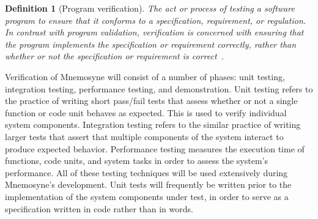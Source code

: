 \documentclass[11pt,a4paper]{article}
\theoremstyle{break}
\newtheorem{defn}{Definition}
\begin{document}
\begin{defn}[Program verification]
The act or process of testing a software program to ensure that it conforms to  a specification, requirement, or regulation. In contrast with \textit{program validation}, verification is concerned with ensuring that the program implements the specification or requirement correctly, rather than whether or not the specification or requirement is correct~\cite{London:2003:PV:1074100.1074730,5937011}.
\end{defn}

Verification of Mnemosyne will consist of a number of phases: unit testing, integration testing, performance testing, and demonstration. Unit testing refers to the practice of writing short pass/fail tests that assess whether or not a single function or code unit behaves as expected. This is used to verify individual system components. Integration testing refers to the similar practice of writing larger tests that assert that multiple components of the system interact to produce expected behavior. Performance testing measures the execution time of functions, code units, and system tasks in order to assess the system's performance. All of these testing techniques will be used extensively during Mnemosyne's development. Unit tests will frequently be written prior to the implementation of the system components under test, in order to serve as a specification written in code rather than in words.
\end{document}

